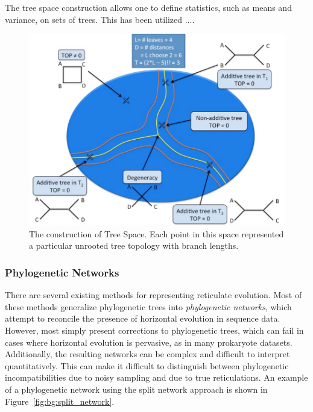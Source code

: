 The tree space construction allows one to define statistics, such as means and variance, on sets of trees.
This has been utilized ....

\begin{figure}
\centering
\includegraphics[]{./fig/TreeSpace.pdf}
\caption[Tree Space Construction]{The construction of Tree Space. Each point in this space represented a particular unrooted tree topology with branch lengths.}
\label{fig:bg:tree_space}
\end{figure}

\subsubsection{Phylogenetic Networks }
\label{bg:bio:phylo:networks}

There are several existing methods for representing reticulate evolution.
Most of these methods generalize phylogenetic trees into \emph{phylogenetic networks}, which attempt to reconcile the presence of horizontal evolution in sequence data.
However, most simply present corrections to phylogenetic trees, which can fail in cases where horizontal evolution is pervasive, as in many prokaryote datasets.
Additionally, the resulting networks can be complex and difficult to interpret quantitatively.
This can make it difficult to distinguish between phylogenetic incompatibilities due to noisy sampling and due to true reticulations.
An example of a phylogenetic network using the split network approach is shown in Figure~\ref{fig:bg:split_network}.


